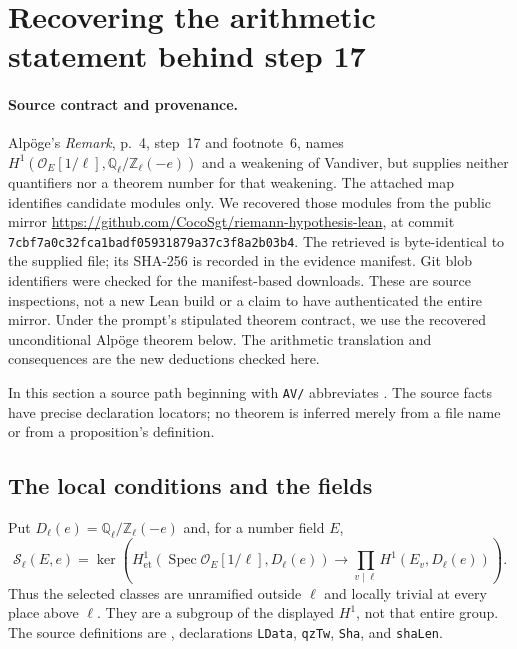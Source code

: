 \documentclass[11pt,a4paper]{article}
\theoremstyle{definition}
\begin{document}
\section{Recovering the arithmetic statement behind step 17}
\label{sec:step17}

\paragraph{Source contract and provenance.}
Alp\"oge's \emph{Remark}, p.~4, step~17 and footnote~6, names
$H^1(\mathcal O_E[1/\ell],\mathbb Q_\ell/\mathbb Z_\ell(-e))$
and a weakening of Vandiver, but supplies neither quantifiers nor a theorem
number for that weakening. The attached map identifies candidate modules only.
We recovered those modules from the public mirror
\url{https://github.com/CocoSgt/riemann-hypothesis-lean}, at commit
\texttt{7cbf7a0c32fca1badf05931879a37c3f8a2b03b4}.
The retrieved  is byte-identical to the supplied file;
its SHA-256 is recorded in the evidence manifest. Git blob identifiers were
checked for the manifest-based downloads. These are source inspections, not
a new Lean build or a claim to have authenticated the entire mirror. Under
the prompt's stipulated theorem contract, we use the recovered unconditional
Alp\"oge theorem below. The arithmetic translation and consequences are the
new deductions checked here.

In this section a source path beginning with \texttt{AV/} abbreviates
.
The source facts have precise declaration locators; no theorem is inferred
merely from a file name or from a proposition's definition.

\subsection{The local conditions and the fields}

Put $D_\ell(e)=\mathbb Q_\ell/\mathbb Z_\ell(-e)$ and, for a number field $E$,
\[
 \mathcal S_\ell(E,e)=
 \ker\left(H^1_{\mathrm{et}}(\operatorname{Spec}\mathcal O_E[1/\ell],D_\ell(e))
       \longrightarrow\prod_{v\mid\ell}H^1(E_v,D_\ell(e))\right).
 \tag{S1}
\]
Thus the selected classes are unramified outside $\ell$ and locally trivial
at every place above $\ell$. They are a subgroup of the displayed $H^1$,
not that entire group. The source definitions are
, declarations
\texttt{LData}, \texttt{qzTw}, \texttt{Sha}, and \texttt{shaLen}.
\end{document}
